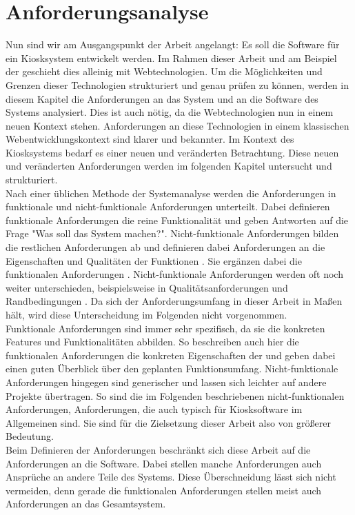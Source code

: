 \chapter{Anforderungsanalyse}
\label{chap:anforderungen}

Nun sind wir am Ausgangspunkt der Arbeit angelangt: Es soll die Software für ein Kiosksystem
entwickelt werden. Im Rahmen dieser Arbeit und am Beispiel der \shst{}
geschieht dies alleinig mit Webtechnologien. Um die Möglichkeiten und Grenzen dieser Technologien
strukturiert und genau prüfen zu können, werden in diesem Kapitel die Anforderungen an das System
und an die Software des Systems analysiert.
Dies ist auch nötig, da die Webtechnologien nun in einem neuen Kontext stehen. Anforderungen an diese
Technologien in einem klassischen Webentwicklungskontext sind klarer und bekannter. Im Kontext
des Kiosksystems bedarf es einer neuen und veränderten Betrachtung. 
Diese neuen und veränderten Anforderungen werden im folgenden Kapitel untersucht und strukturiert.\\

Nach einer üblichen Methode der Systemanalyse werden die Anforderungen in funktionale und 
nicht-funktionale Anforderungen unterteilt. Dabei definieren funktionale Anforderungen die 
reine Funktionalität und geben Antworten 
auf die Frage "Was soll das System machen?". Nicht-funktionale Anforderungen bilden die
restlichen Anforderungen ab und definieren dabei Anforderungen an die Eigenschaften und Qualitäten der
Funktionen \cite{systemanalyse}. Sie ergänzen dabei die funktionalen 
Anforderungen \cite{systematisches}. Nicht-funktionale Anforderungen werden oft noch weiter unterschieden,
beispielsweise in Qualitätsanforderungen und Randbedingungen \cite{systemanalyse,systematisches}.
Da sich der Anforderungsumfang in dieser Arbeit in Maßen hält, wird diese Unterscheidung im Folgenden
nicht vorgenommen.\\
Funktionale Anforderungen sind immer sehr spezifisch, da sie die konkreten Features
und Funktionalitäten abbilden. So beschreiben auch hier die funktionalen Anforderungen die konkreten
Eigenschaften der \shst{} und geben dabei einen guten Überblick über den geplanten Funktionsumfang.
Nicht-funktionale Anforderungen hingegen sind generischer und lassen sich leichter auf andere Projekte
übertragen. So sind die im Folgenden beschriebenen nicht-funktionalen Anforderungen, Anforderungen, die
auch typisch für Kiosksoftware im Allgemeinen sind. Sie sind für die Zielsetzung dieser Arbeit also von 
größerer Bedeutung.\\
Beim Definieren der Anforderungen beschränkt sich diese Arbeit auf die Anforderungen an die Software.
Dabei stellen manche Anforderungen auch Ansprüche an andere Teile des Systems. Diese Überschneidung
lässt sich nicht vermeiden, denn gerade die funktionalen Anforderungen stellen meist auch Anforderungen an das 
Gesamtsystem.\\ 


